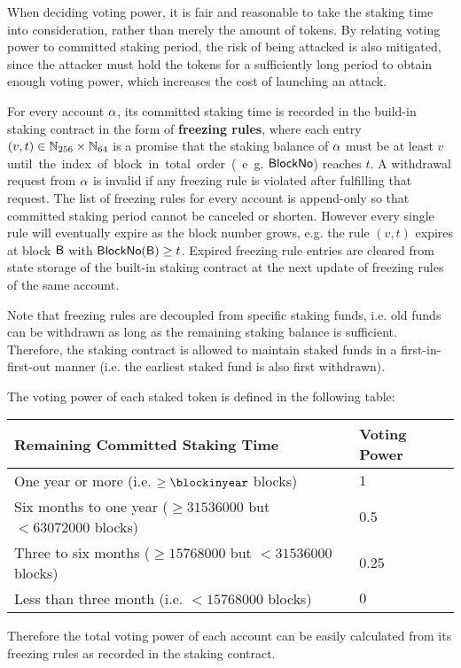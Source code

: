 When deciding voting power, it is fair and reasonable to take the staking time into consideration,
rather than merely the amount of tokens.
By relating voting power to committed staking period, the risk of being attacked is also mitigated,
since the attacker must hold the tokens for a sufficiently long period to obtain enough voting power, which increases the cost of launching an attack.

For every account $\mathbf{\alpha}$, its committed staking time is recorded in the build-in staking contract in the form of 
{\bf freezing rules},
where each entry $(v,t)\in \mathbb{N}_{256}\times\mathbb{N}_{64}$ is a promise that the  staking balance of $\mathbf{\alpha}$ must be at least $v$ \unit until the index of block in total order (e.g. $\mathsf{BlockNo}$) reaches $t$.
A withdrawal request from $\mathbf{\alpha}$ is invalid if any freezing rule is violated after fulfilling that request.
The list of freezing rules for every account is append-only so that committed staking period cannot be canceled or shorten.
However every single rule will eventually expire as the block number grows, e.g. the rule $(v,t)$ expires at block $\textsf{B}$ with $\mathsf{BlockNo}(\textsf{B})\ge t$. 
Expired freezing rule entries are cleared from state storage of the built-in staking contract at the next update of freezing rules of the same account.	

Note that freezing rules are decoupled from specific staking funds, i.e. old funds can be withdrawn as long as the remaining staking balance is sufficient. 
Therefore, the staking contract is allowed to maintain staked funds in a first-in-first-out manner (i.e. the earliest staked fund is also first withdrawn).


The voting power of each staked token is defined in the following table:

\par
\begin{center}
\begin{tabular}{ll}
\toprule
Remaining Committed Staking Time & Voting Power \\
\midrule
One year or more (i.e. $\ge \blockinyear$ blocks) & $1$  \\
Six months to one year ($\ge 31536000$ but $<63072000$ blocks) & $0.5$ \\
Three to six months ($\ge 15768000$ but $<31536000$ blocks) & $0.25$\\
Less than three month (i.e. $< 15768000$ blocks) & $0$ \\
\bottomrule
\end{tabular}
\end{center}
\par
Therefore the total voting power of each account can be easily calculated from its freezing rules as recorded in the staking contract.
